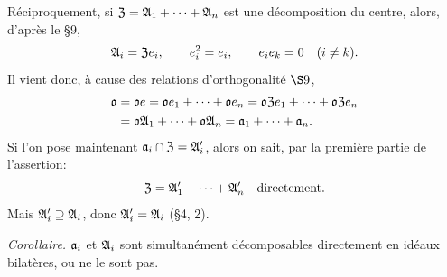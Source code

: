 Réciproquement, si $\mathfrak{Z}=\mathfrak{A}_1+\cdots+\mathfrak{A}_n$ est une décomposition du centre, alors, d'après le \S{}9,
\[
        \mathfrak{A}_i=\mathfrak{Z} e_i,
        \qquad e_i^2=e_i,
        \qquad e_i e_k=0\quad(i\ne k).
\]
Il vient donc, à cause des relations d'orthogonalité \hbox{\(\S 9\)},
\[
\begin{aligned}
        \mathfrak{o}&=\mathfrak{o} e=\mathfrak{o} e_1+\cdots+\mathfrak{o} e_n
        =\mathfrak{o}\mathfrak{Z} e_1+\cdots+\mathfrak{o}\mathfrak{Z} e_n\\
        &=\mathfrak{o}\mathfrak{A}_1+\cdots+\mathfrak{o}\mathfrak{A}_n
        =\mathfrak{a}_1+\cdots+\mathfrak{a}_n .
\end{aligned}
\]
Si l'on pose maintenant $\mathfrak{a}_i\cap\mathfrak{Z}=\mathfrak{A}_i'$, alors on sait, par la première partie de l'assertion:
\[
        \mathfrak{Z}=\mathfrak{A}_1'+\cdots+\mathfrak{A}_n'\quad\hbox{directement}.
\]
Mais $\mathfrak{A}_i'\supseteq\mathfrak{A}_i$, donc $\mathfrak{A}_i'=\mathfrak{A}_i$ (\S 4, 2).

\emph{Corollaire.} $\mathfrak{a}_i$ et $\mathfrak{A}_i$ sont simultanément décomposables directement en idéaux bilatères, ou ne le sont pas.
